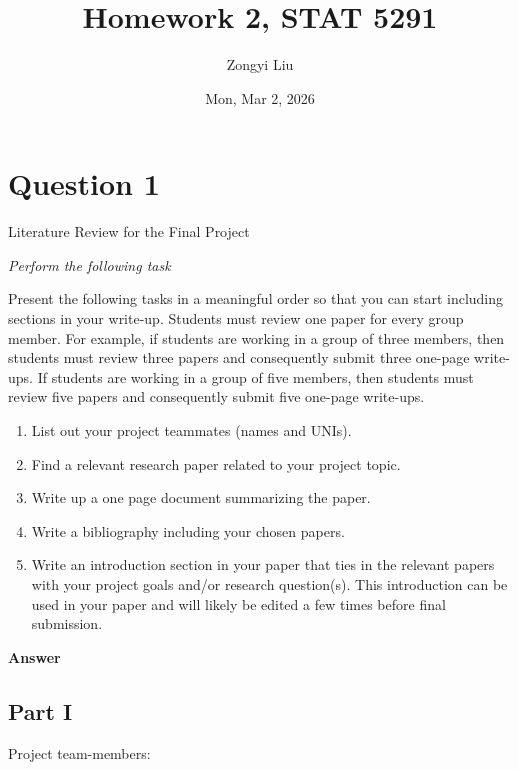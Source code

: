 \documentclass[letterpaper]{article}
\title{Homework 2, STAT 5291}
\author{Zongyi Liu}
\date{Mon, Mar 2, 2026}
\begin{document}
		\maketitle
		
		\tableofcontents
		
		\section{Question 1}
		
		{\color{deepred} Literature Review for the Final Project}
		
		
		\emph{Perform the following task}
		
		Present the following tasks in a meaningful order so that you can start including sections in your write-up. Students must review one paper for every group member. For example, if students are working in a group of three members, then students must review three papers and consequently submit three one-page write-ups. If students are working in a group of five members, then students must review five papers and consequently submit five one-page write-ups.
		
		\begin{enumerate}
			\item[i] List out your project teammates (names and UNIs).
			
			\item[ii] Find a relevant research paper related to your project topic.
			
			\item[iii] Write up a one page document summarizing the paper.
			
			\item[iv] Write a bibliography including your chosen papers.
			
			\item[v] Write an introduction section in your paper that ties in the relevant papers with your project goals and/or research question(s). This introduction can be used in your paper and will likely be edited a few times before final submission.
		\end{enumerate}
		
		\textbf{Answer}
		
		\subsection{Part I}
		
		Project team-members:
		
\end{document}
